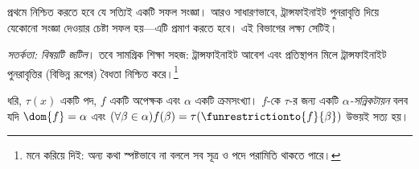 \documentclass[../../../include/open-logic-section]{subfiles}
\begin{document}

প্রথমে নিশ্চিত করতে হবে যে
 সত্যিই একটি সফল সংজ্ঞা।
আরও সাধারণভাবে, ট্রান্সফাইনাইট পুনরাবৃত্তি দিয়ে
যেকোনো সংজ্ঞা দেওয়ার চেষ্টা সফল হয়—এটি প্রমাণ
করতে হবে। এই বিভাগের লক্ষ্য সেটিই।

\emph{সতর্কতা: বিষয়টি জটিল}। তবে সামগ্রিক শিক্ষা
সহজ: ট্রান্সফাইনাইট আবেশ এবং প্রতিস্থাপন মিলে
ট্রান্সফাইনাইট পুনরাবৃত্তির (বিভিন্ন রূপের) বৈধতা
নিশ্চিত করে।\footnote{মনে করিয়ে দিই: অন্য কথা
স্পষ্টভাবে না বললে সব সূত্র ও পদে পরামিতি থাকতে
পারে।}

\begin{defn}
ধরি, $\tau(x)$ একটি পদ, $f$ একটি অপেক্ষক এবং
$\alpha$ একটি ক্রমসংখ্যা। $f$-কে $\tau$-র জন্য
একটি \emph{$\alpha$-সন্নিকটায়ন} বলব যদি
$\dom{f} = \alpha$ এবং $(\forall \beta \in \alpha)f(\beta) = \tau(\funrestrictionto{f}{\beta})$
উভয়ই সত্য হয়।
\end{defn}
\end{document}
